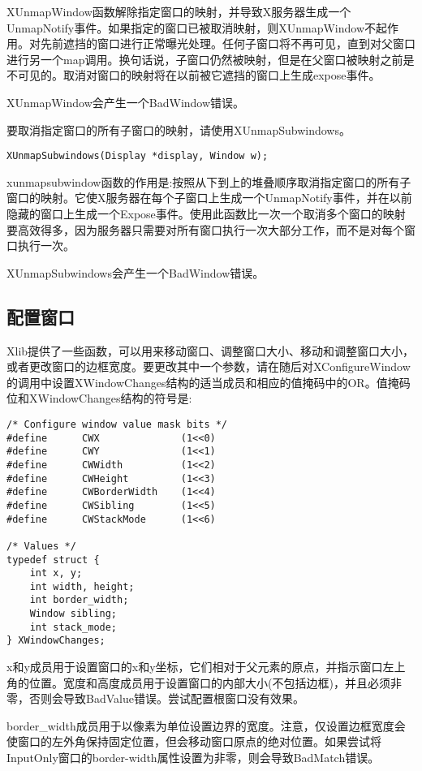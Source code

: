 XUnmapWindow函数解除指定窗口的映射，并导致X服务器生成一个UnmapNotify事件。如果指定的窗口已被取消映射，则XUnmapWindow不起作用。对先前遮挡的窗口进行正常曝光处理。任何子窗口将不再可见，直到对父窗口进行另一个map调用。换句话说，子窗口仍然被映射，但是在父窗口被映射之前是不可见的。取消对窗口的映射将在以前被它遮挡的窗口上生成expose事件。

XUnmapWindow会产生一个BadWindow错误。

要取消指定窗口的所有子窗口的映射，请使用XUnmapSubwindows。

\begin{lstlisting}
XUnmapSubwindows(Display *display, Window w);
\end{lstlisting}

xunmapsubwindow函数的作用是:按照从下到上的堆叠顺序取消指定窗口的所有子窗口的映射。它使X服务器在每个子窗口上生成一个UnmapNotify事件，并在以前隐藏的窗口上生成一个Expose事件。使用此函数比一次一个取消多个窗口的映射要高效得多，因为服务器只需要对所有窗口执行一次大部分工作，而不是对每个窗口执行一次。

XUnmapSubwindows会产生一个BadWindow错误。


\subsection{配置窗口}

Xlib提供了一些函数，可以用来移动窗口、调整窗口大小、移动和调整窗口大小，或者更改窗口的边框宽度。要更改其中一个参数，请在随后对XConfigureWindow的调用中设置XWindowChanges结构的适当成员和相应的值掩码中的OR。值掩码位和XWindowChanges结构的符号是:

\begin{lstlisting}
/* Configure window value mask bits */
#define      CWX              (1<<0)
#define      CWY              (1<<1)
#define      CWWidth          (1<<2)
#define      CWHeight         (1<<3)
#define      CWBorderWidth    (1<<4)
#define      CWSibling        (1<<5)
#define      CWStackMode      (1<<6)

/* Values */
typedef struct {
	int x, y;
	int width, height;
	int border_width;
	Window sibling;
	int stack_mode;
} XWindowChanges;
\end{lstlisting}

x和y成员用于设置窗口的x和y坐标，它们相对于父元素的原点，并指示窗口左上角的位置。宽度和高度成员用于设置窗口的内部大小(不包括边框)，并且必须非零，否则会导致BadValue错误。尝试配置根窗口没有效果。

border\_width成员用于以像素为单位设置边界的宽度。注意，仅设置边框宽度会使窗口的左外角保持固定位置，但会移动窗口原点的绝对位置。如果尝试将InputOnly窗口的border-width属性设置为非零，则会导致BadMatch错误。

